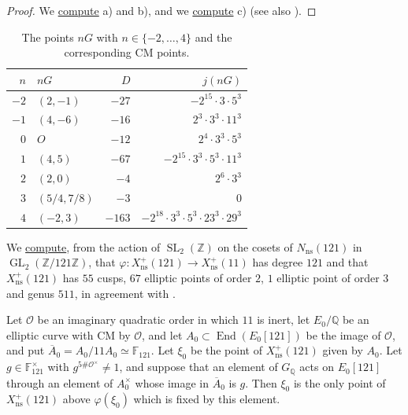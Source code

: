 \documentclass[11pt,reqno]{amsart}
\DeclareMathOperator{\GL}{GL}
\DeclareMathOperator{\SL}{SL}
\DeclareMathOperator{\End}{End}
\newcommand{\Q}{\mathbb{Q}}
\newcommand{\Z}{\mathbb{Z}}
\newcommand{\F}{\mathbb{F}}
\newcommand{\OO}{\mathcal{O}}
\newcommand{\ns}{\mathrm{ns}}
\newcommand{\Xns}[1]{X_{\ns}^+(#1)}
\newcommand{\repocommit}{c12c8c3705ed0b6b52254df69bd5ffe84542d568}
\newcommand{\gitlink}[2]{\href{https://github.com/F-Najman/Xns-121-/blob/\repocommit/#1}{#2}}
\newcommand{\githubbare}[1]{\href{https://github.com/F-Najman/Xns-121-/blob/\repocommit/#1}{\path{#1}}}
\theoremstyle{definition}
\numberwithin{equation}{section}
\begin{document}
\begin{proof}
We \gitlink{code/sieve_bruteforce.m}{compute} a) and b), and we \gitlink{code/cm_lifts.m}{compute} c) (see also \githubbare{code/model.m}).
\end{proof}

\begin{table}[ht]
\centering
\caption{The points $nG$ with $n\in\{-2,\ldots,4\}$ and the corresponding CM points.}
\label{tab:cm}
\begin{tabular}{rlrr}
\toprule
$n$ & $nG$ & $D$ & $j(nG)$\\
\midrule
$-2$ & $(2,-1)$ & $-27$ & $-2^{15}\cdot 3\cdot 5^3$\\
$-1$ & $(4,-6)$ & $-16$ & $2^3\cdot 3^3\cdot 11^3$\\
$0$ & $O$ & $-12$ & $2^4\cdot 3^3\cdot 5^3$\\
$1$ & $(4,5)$ & $-67$ & $-2^{15}\cdot 3^3\cdot 5^3\cdot 11^3$\\
$2$ & $(2,0)$ & $-4$ & $2^6\cdot 3^3$\\
$3$ & $(5/4,7/8)$ & $-3$ & $0$\\
$4$ & $(-2,3)$ & $-163$ & $-2^{18}\cdot 3^3\cdot 5^3\cdot 23^3\cdot 29^3$\\
\bottomrule
\end{tabular}
\end{table}

\begin{remark}
We \gitlink{code/genus.m}{compute}, from the action of $\SL_2(\Z)$ on the cosets of $N_{\ns}(121)$ in $\GL_2(\Z/121\Z)$, that $\varphi\colon \Xns{121}\rightarrow \Xns{11}$ has degree $121$ and that $\Xns{121}$ has $55$ cusps, $67$ elliptic points of order $2$, $1$ elliptic point of order $3$ and genus $511$, in agreement with \cite[Table 2]{RSZB22}.
\end{remark}

\begin{lemma}\label{lem:cm_criterion}
Let $\OO$ be an imaginary quadratic order in which $11$ is inert, let $E_0/\Q$ be an elliptic curve with CM by $\OO$, and let $A_0\subset\End(E_0[121])$ be the image of $\OO$, and put $\overline A_0=A_0/11A_0\simeq\F_{121}$. Let $\xi_0$ be the point of $\Xns{121}$ given by $A_0$. Let $g\in\F_{121}^\times$ with $g^{5\#\OO^\times}\neq 1$, and suppose that an element of $G_\Q$ acts on $E_0[121]$ through an element of $A_0^\times$ whose image in $\overline A_0$ is $g$. Then $\xi_0$ is the only point of $\Xns{121}$ above $\varphi(\xi_0)$ which is fixed by this element.
\end{lemma}
\end{document}
